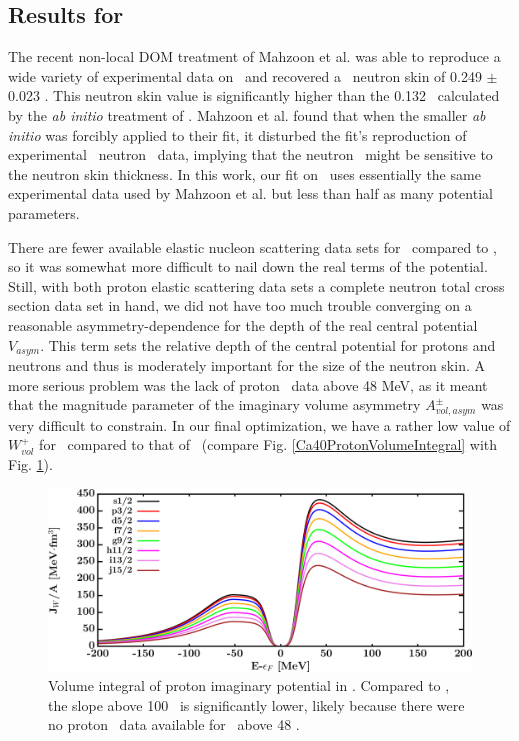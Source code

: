 \subsection{Results for \caEight}
The recent non-local DOM treatment of Mahzoon et al. \cite{Mahzoon2017} was able
to reproduce a wide variety of
experimental data on \caEight\ and recovered a \caEight\ neutron
skin of 0.249 $\pm$ 0.023 \femto\meter.
This neutron skin value is significantly higher than the 0.132 \femto\meter\ calculated by
the \textit{ab initio} treatment of \cite{Hagen2016}. Mahzoon et al. found that when the 
smaller \textit{ab initio} was forcibly applied to their fit, it disturbed the fit's
reproduction of experimental \caEight\ neutron \tot\ data, implying that the neutron \tot\ might
be sensitive to the neutron skin thickness. In this work, our fit on \caEight\ uses essentially the 
same experimental data used by Mahzoon et al. but less than half as many potential parameters.

There are fewer available elastic nucleon scattering data sets for \caEight\ compared to \caForty,
so it was somewhat more difficult to nail down the real terms of the potential. Still, with both
proton elastic scattering data sets a complete neutron total cross section data set in hand, we did
not have too much trouble converging on a reasonable asymmetry-dependence for the depth of the real
central potential $V_{asym}$. This term sets the relative depth of the central potential for protons 
and neutrons and thus is moderately important for the size of the neutron skin. A more serious
problem was the lack of proton \rxn\ data above 48 MeV, as it meant that the magnitude parameter
of the imaginary volume asymmetry $A_{vol, asym}^{\pm}$ was very difficult to constrain. In our
final optimization, we have a rather low value of $W_{vol}^{+}$ for \caEight\ compared to that of
\caForty\ (compare Fig. \ref{Ca40ProtonVolumeIntegral} with Fig.
\ref{Ca48ProtonVolumeIntegral}).

\begin{figure}[tb]
    \centering
    \includegraphics[width=\textwidth]{figures/ca48_protonVolumeIntegrals.png}
    \caption[Volume integral of proton imaginary potential in \caEight]
    {
        Volume integral of proton imaginary potential in \caEight.
        Compared to \caForty, the slope
        above 100 \mega\electronvolt\ is significantly lower, likely
        because there were no proton \rxn\ data
        available for \caEight\ above 48 \mega\electronvolt.
    }
    \label{Ca48ProtonVolumeIntegral}
\end{figure}

